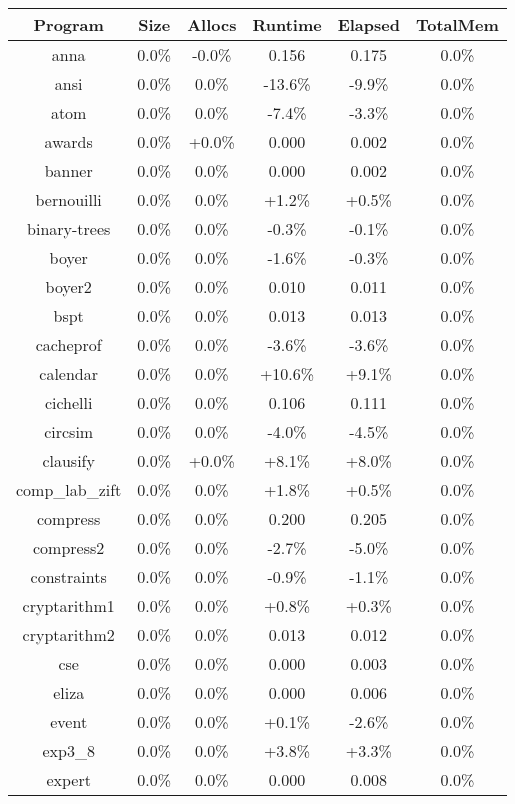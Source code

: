 \begin{tabular}{ c c c c c c }
Program & Size & Allocs & Runtime & Elapsed & TotalMem\\
\hline
anna &  0.0\% & -0.0\% & 0.156 & 0.175 &  0.0\%\\
ansi &  0.0\% &  0.0\% & -13.6\% & -9.9\% &  0.0\%\\
atom &  0.0\% &  0.0\% & -7.4\% & -3.3\% &  0.0\%\\
awards &  0.0\% & +0.0\% & 0.000 & 0.002 &  0.0\%\\
banner &  0.0\% &  0.0\% & 0.000 & 0.002 &  0.0\%\\
bernouilli &  0.0\% &  0.0\% & +1.2\% & +0.5\% &  0.0\%\\
binary-trees &  0.0\% &  0.0\% & -0.3\% & -0.1\% &  0.0\%\\
boyer &  0.0\% &  0.0\% & -1.6\% & -0.3\% &  0.0\%\\
boyer2 &  0.0\% &  0.0\% & 0.010 & 0.011 &  0.0\%\\
bspt &  0.0\% &  0.0\% & 0.013 & 0.013 &  0.0\%\\
cacheprof &  0.0\% &  0.0\% & -3.6\% & -3.6\% &  0.0\%\\
calendar &  0.0\% &  0.0\% & +10.6\% & +9.1\% &  0.0\%\\
cichelli &  0.0\% &  0.0\% & 0.106 & 0.111 &  0.0\%\\
circsim &  0.0\% &  0.0\% & -4.0\% & -4.5\% &  0.0\%\\
clausify &  0.0\% & +0.0\% & +8.1\% & +8.0\% &  0.0\%\\
comp\_lab\_zift &  0.0\% &  0.0\% & +1.8\% & +0.5\% &  0.0\%\\
compress &  0.0\% &  0.0\% & 0.200 & 0.205 &  0.0\%\\
compress2 &  0.0\% &  0.0\% & -2.7\% & -5.0\% &  0.0\%\\
constraints &  0.0\% &  0.0\% & -0.9\% & -1.1\% &  0.0\%\\
cryptarithm1 &  0.0\% &  0.0\% & +0.8\% & +0.3\% &  0.0\%\\
cryptarithm2 &  0.0\% &  0.0\% & 0.013 & 0.012 &  0.0\%\\
cse &  0.0\% &  0.0\% & 0.000 & 0.003 &  0.0\%\\
eliza &  0.0\% &  0.0\% & 0.000 & 0.006 &  0.0\%\\
event &  0.0\% &  0.0\% & +0.1\% & -2.6\% &  0.0\%\\
exp3\_8 &  0.0\% &  0.0\% & +3.8\% & +3.3\% &  0.0\%\\
expert &  0.0\% &  0.0\% & 0.000 & 0.008 &  0.0\%\\

\end{tabular}
